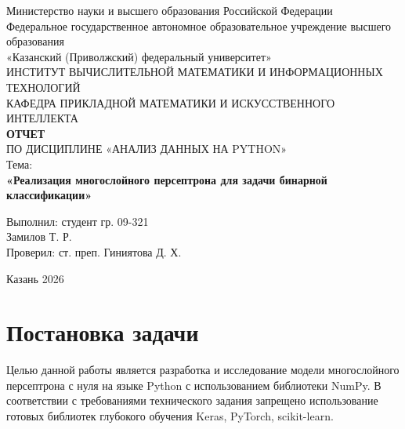 \documentclass[a4paper,14pt]{extarticle}
\begin{document}
\begin{titlepage}
    \centering
    \singlespacing
    \small
    Министерство науки и высшего образования Российской Федерации\\
    Федеральное государственное автономное образовательное учреждение высшего образования\\
    «Казанский (Приволжский) федеральный университет»\\
    \vspace{0.4cm}
    ИНСТИТУТ ВЫЧИСЛИТЕЛЬНОЙ МАТЕМАТИКИ И ИНФОРМАЦИОННЫХ ТЕХНОЛОГИЙ\\
    \vspace{0.4cm}
    КАФЕДРА ПРИКЛАДНОЙ МАТЕМАТИКИ И ИСКУССТВЕННОГО ИНТЕЛЛЕКТА\\

    \vspace{2.5cm}
    \normalsize
    \textbf{ОТЧЕТ}\\[4pt]
    ПО ДИСЦИПЛИНЕ «АНАЛИЗ ДАННЫХ НА PYTHON»\\[14pt]

    Тема:\\
    \textbf{«Реализация многослойного персептрона для задачи бинарной классификации»}\\

    \vfill

    \begin{flushright}
    \normalsize
    Выполнил: студент гр. 09-321\\
    Замилов Т. Р.\\[10pt]
    Проверил: ст. преп. Гиниятова Д. Х.
    \end{flushright}

    \vfill
    \begin{center}
        Казань 2026
    \end{center}
    \thispagestyle{empty}
\end{titlepage}

\newpage
\tableofcontents
\newpage

\section{Постановка задачи}

Целью данной работы является разработка и исследование модели многослойного персептрона с нуля на языке Python с использованием библиотеки NumPy. В соответствии с требованиями технического задания запрещено использование готовых библиотек глубокого обучения Keras, PyTorch, scikit-learn.
\end{document}

